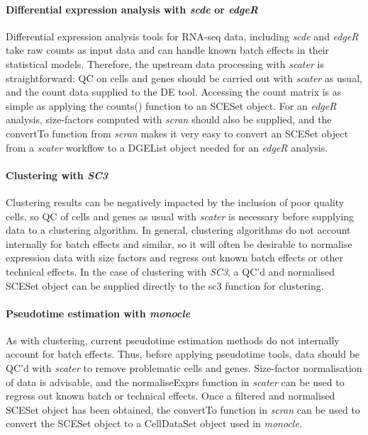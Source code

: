 \documentclass[10pt,letterpaper]{article}
\begin{document}
\paragraph{Differential expression analysis with \emph{scde} or \emph{edgeR}} Differential expression analysis tools for RNA-seq data, including \emph{scde} and \emph{edgeR} take raw counts as input data and can handle known batch effects in their statistical models. Therefore, the upstream data processing with \emph{scater} is straightforward: QC on cells and genes should be carried out with \emph{scater} as usual, and the count data supplied to the DE tool. Accessing the count matrix is as simple as applying the counts() function to an SCESet object. For an \emph{edgeR} analysis, size-factors computed with \emph{scran} should also be supplied, and the convertTo function from \emph{scran} makes it very easy to convert an SCESet object from a \emph{scater} workflow to a DGEList object needed for an \emph{edgeR} analysis.

\paragraph{Clustering with \emph{SC3}} Clustering results can be negatively impacted by the inclusion of poor quality cells, so QC of cells and genes as usual with \emph{scater} is necessary before supplying data to a clustering algorithm. In general, clustering algorithms do not account internally for batch effects and similar, so it will often be desirable to normalise expression data with size factors and regress out known batch effects or other technical effects. In the case of clustering with \emph{SC3}, a QC'd and normalised SCESet object can be supplied directly to the sc3 function for clustering.

\paragraph{Pseudotime estimation with \emph{monocle}} As with clustering, current pseudotime estimation methods do not internally account for batch effects. Thus, before applying pseudotime tools, data should be QC'd with \emph{scater} to remove problematic cells and genes. Size-factor normalisation of data is advisable, and the normaliseExprs function in \emph{scater} can be used to regress out known batch or technical effects. Once a filtered and normalised SCESet object has been obtained, the convertTo function in \emph{scran} can be used to convert the SCESet object to a CellDataSet object used in \emph{monocle}. \newline
\end{document}
